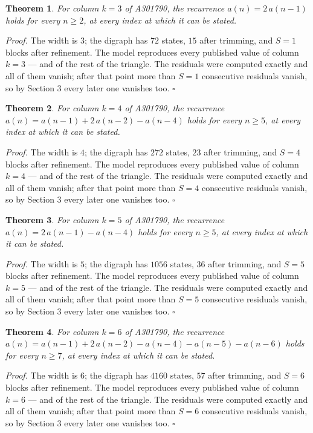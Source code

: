 \documentclass[11pt]{article}
\newtheorem{theorem}{Theorem}
\theoremstyle{definition}
\begin{document}
\begin{theorem} For column $k = 3$ of A301790, the recurrence $a(n) = 2\,a(n-1)$ holds for every $n \ge 2$, at every index at which it can be stated.\end{theorem}

{\itshape Proof.} The width is $3$; the digraph has $72$ states, $15$ after trimming, and $S = 1$ blocks after refinement. The model reproduces every published value of column $k = 3$ --- and of the rest of the triangle. The residuals were computed exactly and all of them vanish; after that point more than $S = 1$ consecutive residuals vanish, so by Section 3 every later one vanishes too. $\square$

\begin{theorem} For column $k = 4$ of A301790, the recurrence $a(n) = a(n-1) + 2\,a(n-2) - a(n-4)$ holds for every $n \ge 5$, at every index at which it can be stated.\end{theorem}

{\itshape Proof.} The width is $4$; the digraph has $272$ states, $23$ after trimming, and $S = 4$ blocks after refinement. The model reproduces every published value of column $k = 4$ --- and of the rest of the triangle. The residuals were computed exactly and all of them vanish; after that point more than $S = 4$ consecutive residuals vanish, so by Section 3 every later one vanishes too. $\square$

\begin{theorem} For column $k = 5$ of A301790, the recurrence $a(n) = 2\,a(n-1) - a(n-4)$ holds for every $n \ge 5$, at every index at which it can be stated.\end{theorem}

{\itshape Proof.} The width is $5$; the digraph has $1056$ states, $36$ after trimming, and $S = 5$ blocks after refinement. The model reproduces every published value of column $k = 5$ --- and of the rest of the triangle. The residuals were computed exactly and all of them vanish; after that point more than $S = 5$ consecutive residuals vanish, so by Section 3 every later one vanishes too. $\square$

\begin{theorem} For column $k = 6$ of A301790, the recurrence $a(n) = a(n-1) + 2\,a(n-2) - a(n-4) - a(n-5) - a(n-6)$ holds for every $n \ge 7$, at every index at which it can be stated.\end{theorem}

{\itshape Proof.} The width is $6$; the digraph has $4160$ states, $57$ after trimming, and $S = 6$ blocks after refinement. The model reproduces every published value of column $k = 6$ --- and of the rest of the triangle. The residuals were computed exactly and all of them vanish; after that point more than $S = 6$ consecutive residuals vanish, so by Section 3 every later one vanishes too. $\square$
\end{document}

